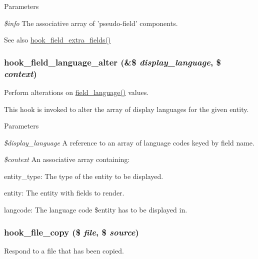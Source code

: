 \begin{DoxyParams}{Parameters}
\item[{\em \$info}]The associative array of 'pseudo-\/field' components.\end{DoxyParams}
\begin{DoxySeeAlso}{See also}
\hyperlink{group__hooks_ga7100332aa5b4d5f6ba72534599d133e5}{hook\_\-field\_\-extra\_\-fields()} 
\end{DoxySeeAlso}
\hypertarget{group__field__attach_ga6411d5b5a528850a6e53c87ff899cabc}{
\subsubsection[{hook\_\-field\_\-language\_\-alter}]{\setlength{\rightskip}{0pt plus 5cm}hook\_\-field\_\-language\_\-alter (\&\$ {\em display\_\-language}, \/  \$ {\em context})}}
\label{group__field__attach_ga6411d5b5a528850a6e53c87ff899cabc}
Perform alterations on \hyperlink{group__field__language_gaff79088cd3951d2127adad1a2c13ad3e}{field\_\-language()} values.

This hook is invoked to alter the array of display languages for the given entity.


\begin{DoxyParams}{Parameters}
\item[{\em \$display\_\-language}]A reference to an array of language codes keyed by field name. \item[{\em \$context}]An associative array containing:
\begin{DoxyItemize}
\item entity\_\-type: The type of the entity to be displayed.
\item entity: The entity with fields to render.
\item langcode: The language code \$entity has to be displayed in. 
\end{DoxyItemize}\end{DoxyParams}
\hypertarget{group__hooks_ga49e2e5f9993e98da69c3434999242711}{
\subsubsection[{hook\_\-file\_\-copy}]{\setlength{\rightskip}{0pt plus 5cm}hook\_\-file\_\-copy (\$ {\em file}, \/  \$ {\em source})}}
\label{group__hooks_ga49e2e5f9993e98da69c3434999242711}
Respond to a file that has been copied.


